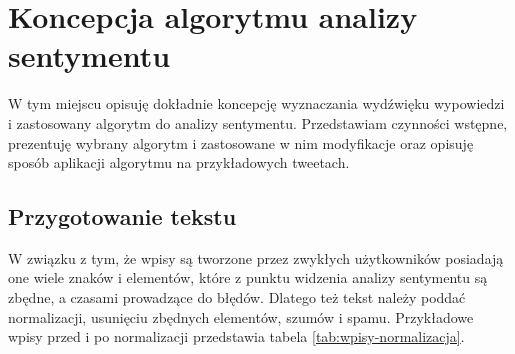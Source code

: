 \section{Koncepcja algorytmu analizy sentymentu}
\label{section:koncepcjaialgorytmanalizysentymentu}

W tym miejscu opisuję dokładnie koncepcję wyznaczania wydźwięku wypowiedzi i
zastosowany algorytm do analizy sentymentu. Przedstawiam czynności wstępne,
prezentuję wybrany algorytm i zastosowane w nim modyfikacje oraz opisuję sposób
aplikacji algorytmu na przykładowych tweetach.

\subsection{Przygotowanie tekstu}
\label{subsection:normalizacjatekstu}

W związku z tym, że wpisy są tworzone przez zwykłych użytkowników posiadają one
wiele znaków i elementów, które z punktu widzenia analizy sentymentu są zbędne,
a czasami prowadzące do błędów. Dlatego też tekst należy poddać normalizacji,
usunięciu zbędnych elementów, szumów i spamu. Przykładowe wpisy przed i po
normalizacji przedstawia tabela \ref{tab:wpisy-normalizacja}.


